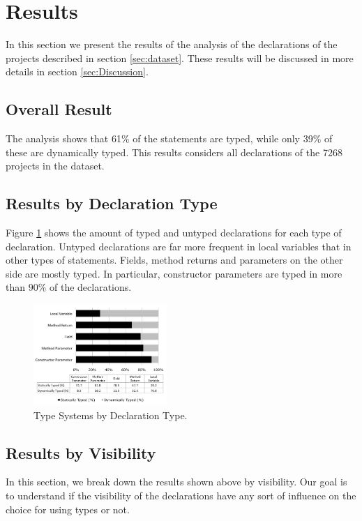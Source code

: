 \documentclass[preprint]{sigplanconf}
\begin{document}
\section{Results\label{sec:Resultados}}

In this section we present the results of the analysis of the declarations of the projects described in section \ref{sec:dataset}. 
These results will be discussed in more details in section \ref{sec:Discussion}.

\subsection{Overall Result\label{sub:overall-result}}
The analysis shows that 61\% of the statements are typed, while only 39\% of these are dynamically typed. This results considers all declarations of the 7268 projects in the dataset.


\subsection{Results by Declaration Type\label{sub:declaration-type-results}}
Figure \ref{fig:tipo_declaracao} shows the amount of typed and untyped declarations for each type of declaration. 
Untyped declarations are far more frequent in local variables that in other types of statements.
Fields, method returns and parameters on the other side are mostly typed. In particular, constructor parameters are typed in more than $90\%$ of the declarations.

\begin{figure}[ht]
\centering 
\includegraphics[width=0.45\textwidth]{images/tipo} 
\caption{Type Systems by Declaration Type.}
\label{fig:tipo_declaracao} 
\end{figure}

\subsection{Results by Visibility\label{sub:visibility-results}}
In this section, we break down the results shown above by visibility. Our goal is to understand if the visibility of the declarations have any sort of influence on the choice for using types or not.
\end{document}
